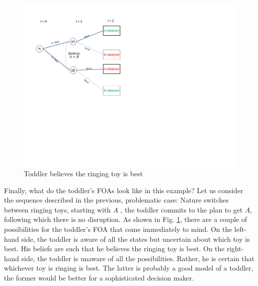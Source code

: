 \documentclass[
11pt,
titlepage,
reqno,
]{article}%
\theoremstyle{definition}
\begin{document}
\begin{figure}[h!]
	\centering
	\includegraphics*[page=18,trim = 0in 5in 1.5in 0in,scale=.7]{Awareness_Diagrams_All}
	\caption{Toddler believes the ringing toy is best\label{Diag: p-18}}%
\end{figure}

Finally, what do the toddler's FOAs look like in this example? Let us consider the sequence described in the previous, problematic case: Nature switches between ringing toys, starting with $A$ , the toddler commits to the plan to get $A$, following which there is no disruption. As shown in Fig. \ref{Diag: p-18}, there are a couple of possibilities for the toddler's FOA that come immediately to mind. On the left-hand side, the toddler is aware of all the states but uncertain about which toy is best. His beliefs are such that he believes the ringing toy is best. On the right-hand side, the toddler is unaware of all the possibilities. Rather, he is certain that whichever toy is ringing is best. The latter is probably a good model of a toddler, the former would be better for a sophisticated decision maker.
\end{document}
